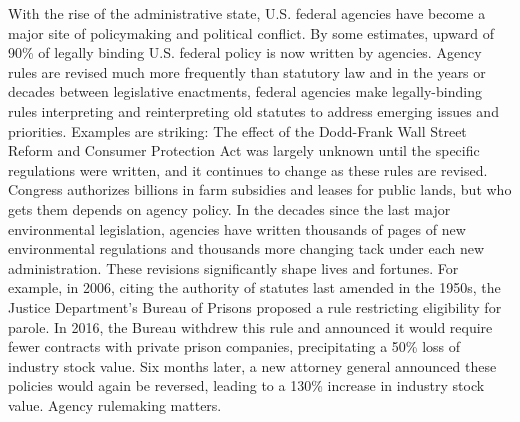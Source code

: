 With the rise of the administrative state, U.S. federal agencies have become a major site of policymaking and political conflict. By some estimates, upward of 90\% of legally binding U.S. federal policy is now written by agencies. Agency rules are revised much more frequently than statutory law \citep{Wagner2017} and in the years or decades between legislative enactments, federal agencies make legally-binding rules interpreting and reinterpreting old statutes to address emerging issues and priorities. %
Examples are striking: The effect of the Dodd-Frank Wall Street Reform and Consumer Protection Act was largely unknown until the specific regulations were written, and it continues to change as these rules are revised. 
Congress authorizes billions in farm subsidies and leases for public lands, but who gets them depends on agency policy. In the decades since the last major environmental legislation, agencies have written thousands of pages of new environmental regulations and thousands more changing tack under each new administration. These revisions significantly shape lives and fortunes. For example, in 2006, citing the authority of statutes last amended in the 1950s, the Justice Department's Bureau of Prisons proposed a rule restricting eligibility for parole. In 2016, the Bureau withdrew this rule and announced it would require fewer contracts with private prison companies, precipitating a 50\% loss of industry stock value. Six months later, a new attorney general announced these policies would again be reversed, leading to a 130\% increase in industry stock value. %
Agency rulemaking matters.

